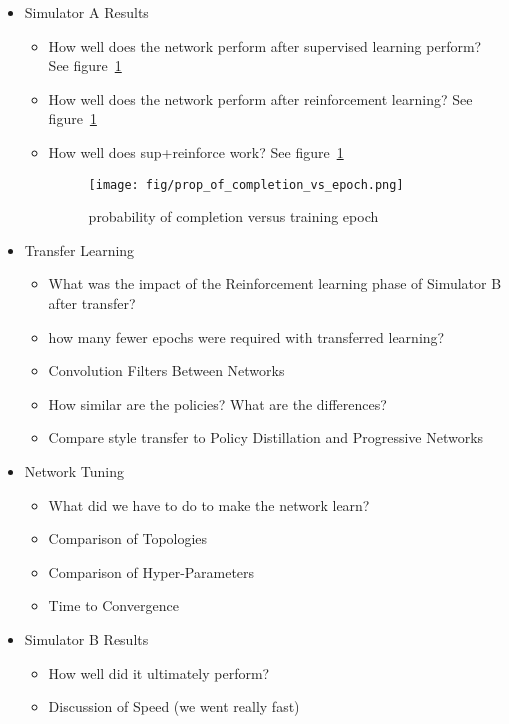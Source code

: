 \documentclass[paper=a4, fontsize=11pt]{scrartcl} %
\begin{document}
\begin{itemize}
	\item Simulator A Results
	\begin{itemize}
		\item How well does the network perform after supervised learning perform? See figure~\ref{fig:prob_completion_vs_epoch}
		\item How well does the network perform after reinforcement learning? See figure~\ref{fig:prob_completion_vs_epoch}
		\item How well does sup+reinforce work? See figure~\ref{fig:prob_completion_vs_epoch}
		\begin{figure}
			\texttt{[image: fig/prop\_of\_completion\_vs\_epoch.png]}
			\caption{probability of completion versus training epoch}
			\label{fig:prob_completion_vs_epoch}
		\end{figure}
	\end{itemize}

	\item Transfer Learning
	\begin{itemize}
	    \item What was the impact of the Reinforcement learning phase of Simulator B after transfer?
		\item how many fewer epochs were required with transferred learning?
		\item Convolution Filters Between Networks
		\item How similar are the policies?  What are the differences?
		\item Compare style transfer to Policy Distillation and Progressive Networks
	\end{itemize}

	\item Network Tuning
	\begin{itemize}
		\item What did we have to do to make the network learn?
		\item Comparison of Topologies
		\item Comparison of Hyper-Parameters
		\item Time to Convergence
	\end{itemize}

	\item Simulator B Results
	\begin{itemize}
		\item How well did it ultimately perform?
		\item Discussion of Speed (we went really fast)
	\end{itemize}

\end{itemize}
\end{document}
